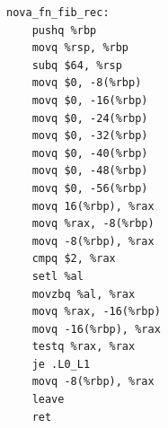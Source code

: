 \begin{lstlisting}[basicstyle=\ttfamily\scriptsize]
nova_fn_fib_rec:
    pushq %rbp
    movq %rsp, %rbp
    subq $64, %rsp
    movq $0, -8(%rbp)
    movq $0, -16(%rbp)
    movq $0, -24(%rbp)
    movq $0, -32(%rbp)
    movq $0, -40(%rbp)
    movq $0, -48(%rbp)
    movq $0, -56(%rbp)
    movq 16(%rbp), %rax
    movq %rax, -8(%rbp)
    movq -8(%rbp), %rax
    cmpq $2, %rax
    setl %al
    movzbq %al, %rax
    movq %rax, -16(%rbp)
    movq -16(%rbp), %rax
    testq %rax, %rax
    je .L0_L1
    movq -8(%rbp), %rax
    leave
    ret
\end{lstlisting}

